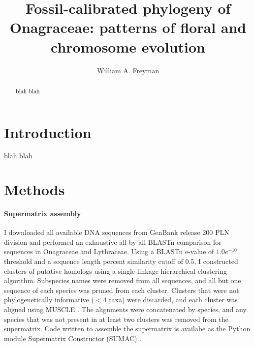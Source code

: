 \documentclass[review]{elsarticle}
\begin{document}
\begin{frontmatter}

\title{Fossil-calibrated phylogeny of Onagraceae: patterns of floral and chromosome evolution}

\author[berk]{William A. Freyman}

\address[berk]{Jepson Herbarium and Department of Integrative Biology, University of California, Berkeley}

\begin{abstract}
blah blah
\end{abstract}

\end{frontmatter}



\linenumbers

\section{Introduction}

blah blah

\section{Methods}

\paragraph{Supermatrix assembly} 

I downloaded all available DNA sequences from GenBank release 200 PLN division and
performed an exhaustive all-by-all BLASTn \citep{blast} comparison for sequences in Onagraceae
and Lythraceae.
Using a BLASTn e-value of $1.0e^{-10}$ threshold and a sequence length
percent similarity cutoff of 0.5,
I constructed clusters of putative homologs using a single-linkage hierarchical clustering algorithm.
Subspecies names were removed from all sequences, and all but one sequence of each species was pruned from each cluster.
Clusters that were not phylogenetically informative ($< 4$ taxa) were discarded,
and each cluster was aligned using MUSCLE \citep{edgar2004muscle}. 
The alignments were concatenated by species, and any species that was not present in at least
two clusters was removed from the supermatrix.
Code written to assemble the supermatrix is availabe as the Python module 
Supermatrix Constructor (SUMAC) \citep[\url{https://github.com/wf8/sumac}]{sumac}.
\end{document}

